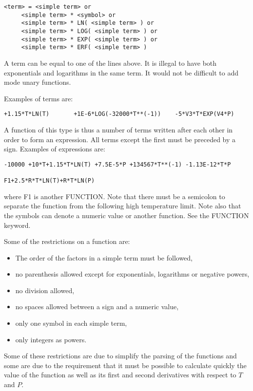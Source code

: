\documentclass[12pt]{article}
\begin{document}
\begin{verbatim}
<term> = <simple term> or
	 <simple term> * <symbol> or
	 <simple term> * LN( <simple term> ) or
	 <simple term> * LOG( <simple term> ) or
	 <simple term> * EXP( <simple term> ) or
	 <simple term> * ERF( <simple term> )
\end{verbatim}

A term can be equal to one of the lines above.  It is illegal to have
both exponentials and logarithms in the same term.  It would not be
difficult to add mode unary functions.

Examples of terms are:

\begin{verbatim}
+1.15*T*LN(T)       +1E-6*LOG(-32000*T**(-1))    -5*V3*T*EXP(V4*P)
\end{verbatim}

A function of this type is thus a number of terms written after
each other in order to form an expression.  All terms except the first
must be preceded by a sign.  Examples of expressions are:

\begin{verbatim}
-10000 +10*T+1.15*T*LN(T) +7.5E-5*P +134567*T**(-1) -1.13E-12*T*P

F1+2.5*R*T*LN(T)+R*T*LN(P)
\end{verbatim}
where F1 is another FUNCTION.  Note that there must be a semicolon to
separate the function from the following high temperature limit.  Note
also that the symbols can denote a numeric value or another function.
See the FUNCTION keyword.

Some of the restrictions on a function are:                 
\begin{itemize}
\item The order of the factors in a simple term must be followed,
\item no parenthesis allowed except for exponentials, logarithms or
  negative powers,
\item no division allowed,                                             
\item no spaces allowed between a sign and a numeric value,            
\item only one symbol in each simple term,
\item only integers as powers.
\end{itemize}

Some of these restrictions are due to simplify the parsing of the
functions and some are due to the requirement that it must be possible
to calculate quickly the value of the function as well as its first
and second derivatives with respect to $T$ and $P$.
\end{document}
